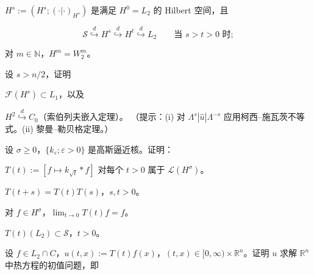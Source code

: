 \begin{exercises}
\begin{subitems}
$ H^s := (H^s ; (\cdot|\cdot)_{H^s}) $ 是满足 $ H^0 = L_2 $ 的 Hilbert 空间，且

\[
\mathcal{S} \overset{d}{\hookrightarrow} H^s \overset{d}{\hookrightarrow} H^t \overset{d}{\hookrightarrow} L_2 \qquad \text{当 } s > t > 0 \text{ 时} ;
\]
\item

对 $ m \in \mathbb{N} $，$ H^m = W_2^m $。

\end{subitems}

\item

设 $ s > n/2 $，证明

\begin{subitems}
\item

$ \mathcal{F}(H^s) \subset L_1 $，以及

\item

$ H^2 \overset{d}{\hookrightarrow} C_0 $（索伯列夫嵌入定理）。
（提示：(i) 对 $ \Lambda^s |\widehat{u}| \Lambda^{-s} $ 应用柯西–施瓦茨不等式。(ii) 黎曼–勒贝格定理。）

\end{subitems}

\item

设 $ \sigma \ge 0 $，$ \{k_\varepsilon ; \varepsilon > 0\} $ 是高斯逼近核。证明：

\begin{subitems}
\item

$ T(t) := [f \mapsto k_{\sqrt{t}} * f] $ 对每个 $ t > 0 $ 属于 $ \mathcal{L}(H^\sigma) $。

\item

$ T(t + s) = T(t)T(s) $，$ s, t > 0 $。

\item

对 $ f \in H^\sigma $，$ \lim_{t \to 0} T(t)f = f $。

\item

$ T(t)(L_2) \subset \mathcal{S} $，$ t > 0 $。

\item

设 $ f \in L_2 \cap C $，$ u(t, x) := T(t)f(x) $，$ (t, x) \in [0, \infty) \times \mathbb{R}^n $。证明 $ u $ 求解 $ \mathbb{R}^n $ 中热方程的初值问题，即


\end{subitems}
\end{exercises}
